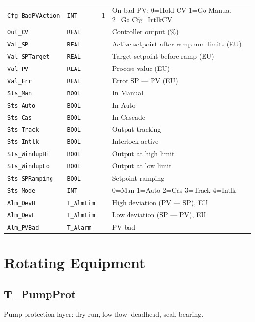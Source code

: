 \begin{small}
\begin{longtable}{@{}P{3.70cm}P{2.20cm}P{1.70cm}P{8.91cm}@{}}
\texttt{Cfg\_BadPVAction} & \texttt{INT} & 1 & On bad PV: 0=Hold CV 1=Go Manual 2=Go Cfg\_IntlkCV \\
\texttt{Out\_CV} & \texttt{REAL} &  & Controller output (\%) \\
\texttt{Val\_SP} & \texttt{REAL} &  & Active setpoint after ramp and limits (EU) \\
\texttt{Val\_SPTarget} & \texttt{REAL} &  & Target setpoint before ramp (EU) \\
\texttt{Val\_PV} & \texttt{REAL} &  & Process value (EU) \\
\texttt{Val\_Err} & \texttt{REAL} &  & Error SP --- PV (EU) \\
\texttt{Sts\_Man} & \texttt{BOOL} &  & In Manual \\
\texttt{Sts\_Auto} & \texttt{BOOL} &  & In Auto \\
\texttt{Sts\_Cas} & \texttt{BOOL} &  & In Cascade \\
\texttt{Sts\_Track} & \texttt{BOOL} &  & Output tracking \\
\texttt{Sts\_Intlk} & \texttt{BOOL} &  & Interlock active \\
\texttt{Sts\_WindupHi} & \texttt{BOOL} &  & Output at high limit \\
\texttt{Sts\_WindupLo} & \texttt{BOOL} &  & Output at low limit \\
\texttt{Sts\_SPRamping} & \texttt{BOOL} &  & Setpoint ramping \\
\texttt{Sts\_Mode} & \texttt{INT} &  & 0=Man 1=Auto 2=Cas 3=Track 4=Intlk \\
\texttt{Alm\_DevH} & \texttt{T\_AlmLim} &  & High deviation (PV --- SP), EU \\
\texttt{Alm\_DevL} & \texttt{T\_AlmLim} &  & Low deviation (SP --- PV), EU \\
\texttt{Alm\_PVBad} & \texttt{T\_Alarm} &  & PV bad \\
\bottomrule
\end{longtable}
\end{small}

\section{Rotating Equipment}

\subsection{T\_PumpProt}\label{sec:pclib-t-pumpprot}

Pump protection layer: dry run, low flow, deadhead, seal, bearing.

